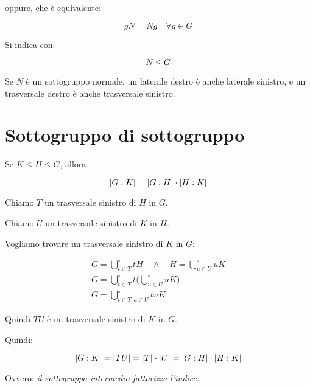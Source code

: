 oppure, che è equivalente:

\begin{equation}
	gN = Ng \quad \forall g \in G
\end{equation}

Si indica con:

\begin{equation}
	N \unlhd G
\end{equation}

Se $N$ è un sottogruppo normale, un laterale destro è anche laterale sinistro, e un trasversale destro è anche trasversale sinistro.

\section{Sottogruppo di sottogruppo}

\begin{teorema}
	\label{thr:fattorizzazione_indici}
	Se $K \le H \le G$, allora
	
	\begin{equation}
		\lvert G:K \rvert = \lvert G:H \rvert \cdot \lvert H:K \rvert
	\end{equation} 
\end{teorema}
\begin{dimostrazione}
	Chiamo $T$ un trasversale sinistro di $H$ in $G$.
	
	Chiamo $U$ un trasversale sinistro di $K$ in $H$.
	
	Vogliamo trovare un trasversale sinistro di $K$ in $G$:
	
	\begin{gather}
		G = \bigcup^\circ_{t \in T} tH \quad\land\quad H = \bigcup^\circ_{u \in U} uK \\
		G = \bigcup^\circ_{t \in T} t \biggl(\bigcup^\circ_{u \in U} uK\biggr) \\
		G = \bigcup^\circ_{t \in T, u \in U} tuK
	\end{gather}

	Quindi $TU$ è un trasversale sinistro di $K$ in $G$.
	
	Quindi:
	
	\begin{equation*}
		\lvert G:K \rvert = \lvert TU \rvert = \lvert T \rvert \cdot \lvert U \rvert = \lvert G:H \rvert \cdot \lvert H:K \rvert
	\end{equation*}

	Ovvero: \emph{il sottogruppo intermedio fattorizza l'indice}.
\end{dimostrazione}

